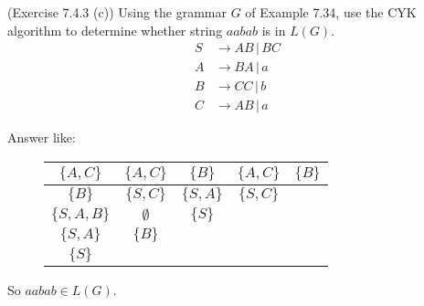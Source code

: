 \documentclass[10pt]{homework}
\begin{document}

\begin{problem} (Exercise 7.4.3 (c)) Using the grammar $G$ of Example 7.34, use
  the CYK algorithm to determine whether string $aabab$ is in $L(G)$.
  \begin{align*}
    S & \rightarrow AB \,|\, BC\\
    A & \rightarrow BA \,|\, a\\
    B & \rightarrow CC \,|\, b\\
    C & \rightarrow AB \,|\, a
  \end{align*}
\end{problem}

\begin{solution}
    Answer like:

    \begin{figure}[htbp]
        \centering
        \begin{tabular}{c|c|c|c|c}
            $\{A,C\}$ & $\{A,C\}$ & $\{B\}$ & $\{A,C\}$ & $\{B\}$ \\\hline
            $\{B\}$ & $\{S,C\}$ & $\{S,A\}$ & $\{S,C\}$\\\hline
            $\{S,A,B\}$ & $\emptyset$ & $\{S\}$ \\\hline
            $\{S,A\}$ & $\{B\}$ \\\hline
            $\{S\}$
        \end{tabular}
    \end{figure}
    So $aabab\in L\left( G \right) $.
\end{solution}
\end{document}
